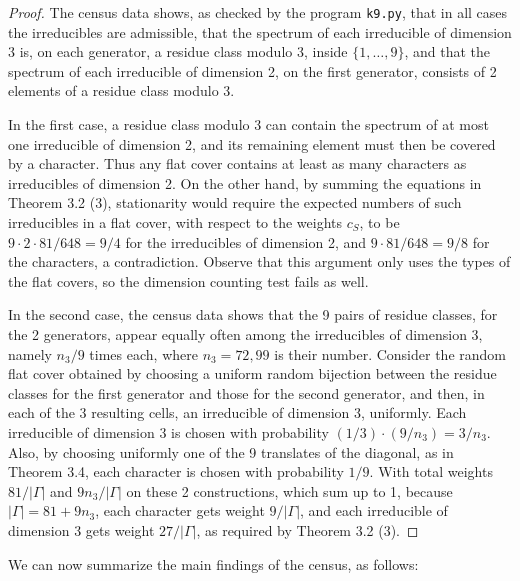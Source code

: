 \documentclass[12pt]{amsart}
\theoremstyle{definition}
\begin{document}
\begin{proof}
The census data shows, as checked by the program {\tt k9.py}, that in all cases the irreducibles are admissible, that the spectrum of each irreducible of dimension 3 is, on each generator, a residue class modulo 3, inside $\{1,\ldots,9\}$, and that the spectrum of each irreducible of dimension 2, on the first generator, consists of 2 elements of a residue class modulo 3.

In the first case, a residue class modulo 3 can contain the spectrum of at most one irreducible of dimension 2, and its remaining element must then be covered by a character. Thus any flat cover contains at least as many characters as irreducibles of dimension 2. On the other hand, by summing the equations in Theorem 3.2 (3), stationarity would require the expected numbers of such irreducibles in a flat cover, with respect to the weights $c_S$, to be $9\cdot2\cdot81/648=9/4$ for the irreducibles of dimension 2, and $9\cdot81/648=9/8$ for the characters, a contradiction. Observe that this argument only uses the types of the flat covers, so the dimension counting test fails as well.

In the second case, the census data shows that the 9 pairs of residue classes, for the 2 generators, appear equally often among the irreducibles of dimension 3, namely $n_3/9$ times each, where $n_3=72,99$ is their number. Consider the random flat cover obtained by choosing a uniform random bijection between the residue classes for the first generator and those for the second generator, and then, in each of the 3 resulting cells, an irreducible of dimension 3, uniformly. Each irreducible of dimension 3 is chosen with probability $(1/3)\cdot(9/n_3)=3/n_3$. Also, by choosing uniformly one of the 9 translates of the diagonal, as in Theorem 3.4, each character is chosen with probability $1/9$. With total weights $81/|\Gamma|$ and $9n_3/|\Gamma|$ on these 2 constructions, which sum up to 1, because $|\Gamma|=81+9n_3$, each character gets weight $9/|\Gamma|$, and each irreducible of dimension 3 gets weight $27/|\Gamma|$, as required by Theorem 3.2 (3).
\end{proof}

We can now summarize the main findings of the census, as follows:
\end{document}
